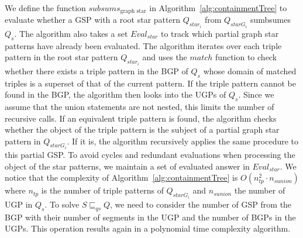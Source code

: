 We define the function $subsums_{\text{graph star}}$ in Algorithm~\ref{alg:containmentTree} to evaluate whether a GSP with a root star pattern $Q_{star_i}$ from $Q_{starG_i}$ sumbsumes $Q_s$. 
The algorithm also takes a set $Eval_{star}$ to track which partial graph star patterns have already been evaluated.
The algorithm iterates over each triple pattern in the root star pattern $Q_{star_i}$ and uses the $match$ function to check whether there exists a triple pattern in the BGP of $Q_s$ whose domain of matched triples is a superset of that of the current pattern.
If the triple pattern cannot be found in the BGP, the algorithm then looks into the UGPs of $Q_s$. 
Since we assume that the union statements are not nested, this limits the number of recursive calls.
If an equivalent triple pattern is found, the algorithm checks whether the object of the triple pattern is the subject of a partial graph star pattern in $Q_{starG_i}$.
If it is, the algorithm recursively applies the same procedure to this partial GSP.
To avoid cycles and redundant evaluations when processing the object of the star patterns, we maintain a set of evaluated answer in $Eval_{star}$.
We notice that the complexity of Algorithm~\ref{alg:containmentTree} is $O(n_{tp}^2 \cdot n_{sunion})$
where $n_{tp}$ is the number of triple patterns of $Q_{starG_i}$ and $n_{sunion}$ the number of UGP in $Q_s$.
To solve $S \sqsubseteq_{qs} Q$, we need to consider the number of GSP from the BGP with their number of segments in the UGP and the number of BGPs in the UGPs.
This operation results again in a polynomial time complexity algorithm.
